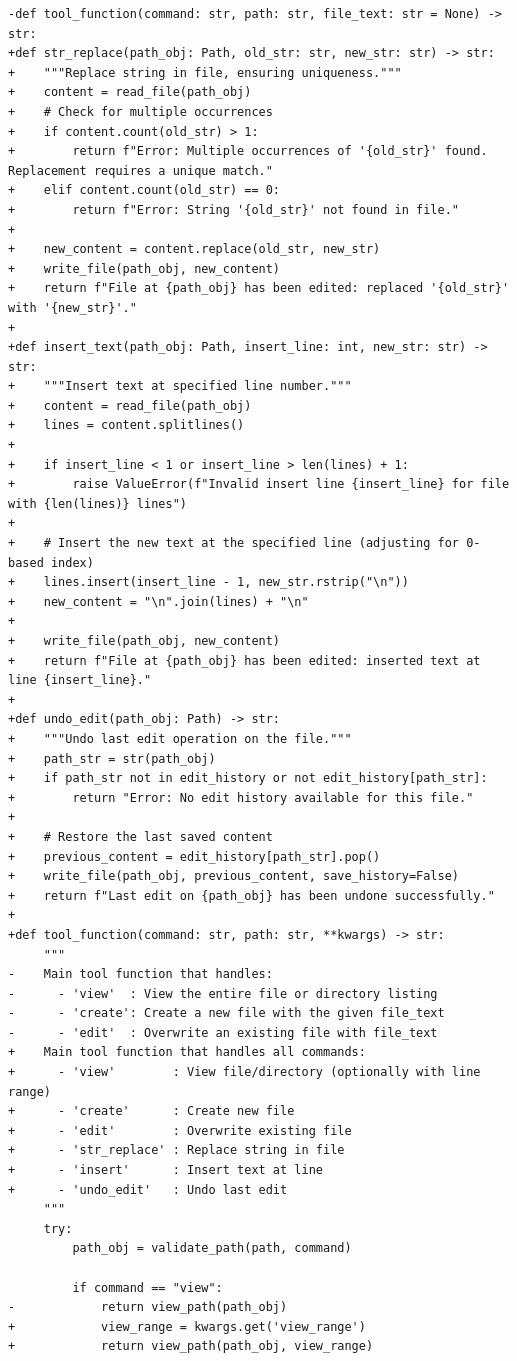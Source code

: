 \documentclass{article} %
\begin{document}
\begin{lstlisting}[style=diffstyle]
-def tool_function(command: str, path: str, file_text: str = None) -> str:
+def str_replace(path_obj: Path, old_str: str, new_str: str) -> str:
+    """Replace string in file, ensuring uniqueness."""
+    content = read_file(path_obj)
+    # Check for multiple occurrences
+    if content.count(old_str) > 1:
+        return f"Error: Multiple occurrences of '{old_str}' found. Replacement requires a unique match."
+    elif content.count(old_str) == 0:
+        return f"Error: String '{old_str}' not found in file."
+
+    new_content = content.replace(old_str, new_str)
+    write_file(path_obj, new_content)
+    return f"File at {path_obj} has been edited: replaced '{old_str}' with '{new_str}'."
+
+def insert_text(path_obj: Path, insert_line: int, new_str: str) -> str:
+    """Insert text at specified line number."""
+    content = read_file(path_obj)
+    lines = content.splitlines()
+
+    if insert_line < 1 or insert_line > len(lines) + 1:
+        raise ValueError(f"Invalid insert line {insert_line} for file with {len(lines)} lines")
+
+    # Insert the new text at the specified line (adjusting for 0-based index)
+    lines.insert(insert_line - 1, new_str.rstrip("\n"))
+    new_content = "\n".join(lines) + "\n"
+    
+    write_file(path_obj, new_content)
+    return f"File at {path_obj} has been edited: inserted text at line {insert_line}."
+
+def undo_edit(path_obj: Path) -> str:
+    """Undo last edit operation on the file."""
+    path_str = str(path_obj)
+    if path_str not in edit_history or not edit_history[path_str]:
+        return "Error: No edit history available for this file."
+
+    # Restore the last saved content
+    previous_content = edit_history[path_str].pop()
+    write_file(path_obj, previous_content, save_history=False)
+    return f"Last edit on {path_obj} has been undone successfully."
+
+def tool_function(command: str, path: str, **kwargs) -> str:
     """
-    Main tool function that handles:
-      - 'view'  : View the entire file or directory listing
-      - 'create': Create a new file with the given file_text
-      - 'edit'  : Overwrite an existing file with file_text
+    Main tool function that handles all commands:
+      - 'view'        : View file/directory (optionally with line range)
+      - 'create'      : Create new file
+      - 'edit'        : Overwrite existing file
+      - 'str_replace' : Replace string in file
+      - 'insert'      : Insert text at line
+      - 'undo_edit'   : Undo last edit
     """
     try:
         path_obj = validate_path(path, command)
 
         if command == "view":
-            return view_path(path_obj)
+            view_range = kwargs.get('view_range')
+            return view_path(path_obj, view_range)
 

\end{lstlisting}
\end{document}
